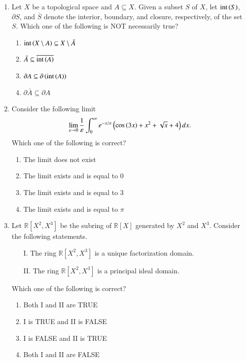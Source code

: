 \documentclass[journal,12pt,onecolumn]{IEEEtran}
\theoremstyle{remark}
\begin{document}
\begin{enumerate}
\item Let $X$ be a topological space and $A \subseteq X$. Given a subset $S$ of $X$, let $\text{int}\left(S\right)$, $\partial S$, and $\bar{S}$ denote the interior, boundary, and closure, respectively, of the set $S$. Which one of the following is NOT necessarily true? \hfill{}
\begin{enumerate}
    \item $\text{int}\left(X \setminus A\right) \subseteq X \setminus \bar{A}$
    \item $\bar{A} \subseteq \overline{\text{int}\left(A\right)}$
    \item $\partial A \subseteq \partial \left(\text{int}\left(A\right)\right)$
    \item $\partial \bar{A} \subseteq \partial A$
\end{enumerate}

\item Consider the following limit
\[ \lim_{\varepsilon \to 0} \frac{1}{\varepsilon} \int_0^\infty e^{-x/\varepsilon} \left(\cos\left(3x\right) + x^2 + \sqrt{x} + 4\right) dx. \]
Which one of the following is correct? \hfill{}
\begin{enumerate}
    \item The limit does not exist
    \item The limit exists and is equal to $0$
    \item The limit exists and is equal to $3$
    \item The limit exists and is equal to $\pi$
\end{enumerate}

\item Let $\mathbb{R}[X^2, X^3]$ be the subring of $\mathbb{R}[X]$ generated by $X^2$ and $X^3$. Consider the following statements.
\begin{enumerate}
    \item[I.] The ring $\mathbb{R}[X^2, X^3]$ is a unique factorization domain.
    \item[II.] The ring $\mathbb{R}[X^2, X^3]$ is a principal ideal domain.
\end{enumerate}
Which one of the following is correct? \hfill{}
\begin{enumerate}
    \item Both I and II are TRUE
    \item I is TRUE and II is FALSE
    \item I is FALSE and II is TRUE
    \item Both I and II are FALSE
\end{enumerate}


\end{enumerate}
\end{document}

